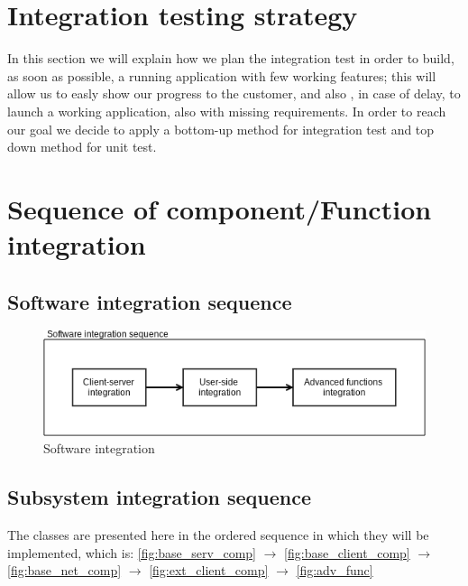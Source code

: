 \section{Integration testing strategy}
In this section we will explain how we plan the integration test
in order to build, as soon as possible, a running application 
with few working features; this will allow us to easly show
our progress to the customer, and also , in case of delay, 
to launch a working application, also with missing requirements.
In order to reach our goal we decide to apply a bottom-up method
for integration test and top down method for unit test.

\section{Sequence of component/Function integration}

\subsection{Software integration sequence}
\begin{figure} [h]
  \centering
  \includegraphics[scale=0.72]{diagrams/software integration.png}
  \caption{\label{fig:soft_int} Software integration}
\end{figure}

\subsection{Subsystem integration sequence}
The classes are presented here in the ordered sequence in which they will be implemented, which is:
\ref{fig:base_serv_comp} $\rightarrow$ \ref{fig:base_client_comp} $\rightarrow$ \ref{fig:base_net_comp}
 $\rightarrow$ \ref{fig:ext_client_comp} $\rightarrow$ \ref{fig:adv_func}

